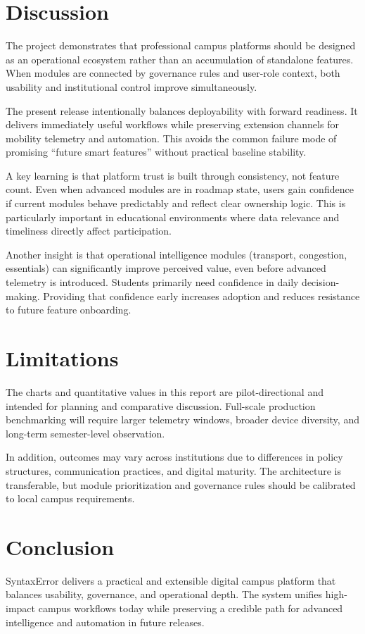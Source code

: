 \documentclass[conference]{IEEEtran}
\begin{document}
\section{Discussion}
The project demonstrates that professional campus platforms should be designed as an operational ecosystem rather than an accumulation of standalone features. When modules are connected by governance rules and user-role context, both usability and institutional control improve simultaneously.

The present release intentionally balances deployability with forward readiness. It delivers immediately useful workflows while preserving extension channels for mobility telemetry and automation. This avoids the common failure mode of promising ``future smart features'' without practical baseline stability.

A key learning is that platform trust is built through consistency, not feature count. Even when advanced modules are in roadmap state, users gain confidence if current modules behave predictably and reflect clear ownership logic. This is particularly important in educational environments where data relevance and timeliness directly affect participation.

Another insight is that operational intelligence modules (transport, congestion, essentials) can significantly improve perceived value, even before advanced telemetry is introduced. Students primarily need confidence in daily decision-making. Providing that confidence early increases adoption and reduces resistance to future feature onboarding.

\section{Limitations}
The charts and quantitative values in this report are pilot-directional and intended for planning and comparative discussion. Full-scale production benchmarking will require larger telemetry windows, broader device diversity, and long-term semester-level observation.

In addition, outcomes may vary across institutions due to differences in policy structures, communication practices, and digital maturity. The architecture is transferable, but module prioritization and governance rules should be calibrated to local campus requirements.

\section{Conclusion}
SyntaxError delivers a practical and extensible digital campus platform that balances usability, governance, and operational depth. The system unifies high-impact campus workflows today while preserving a credible path for advanced intelligence and automation in future releases.
\end{document}

